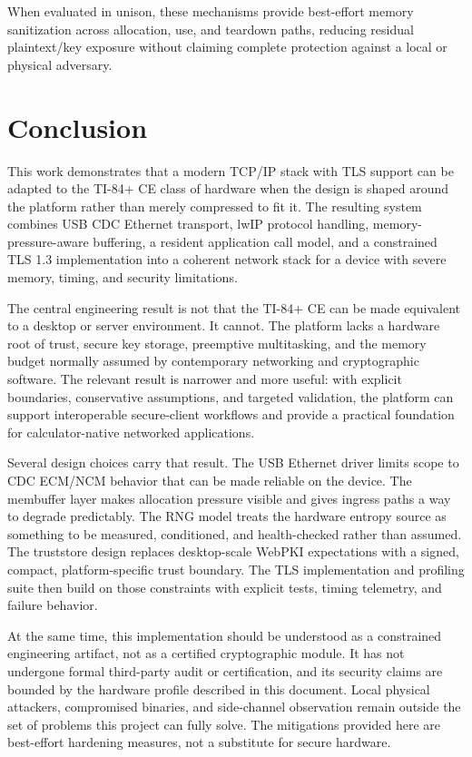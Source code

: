\documentclass[titlepage]{report}
\begin{document}
When evaluated in unison, these mechanisms provide best-effort memory sanitization across allocation, use, and teardown paths, reducing residual plaintext/key exposure without claiming complete protection against a local or physical adversary.

	
		\newpage
		
		\section{Conclusion}
		This work demonstrates that a modern TCP/IP stack with TLS support can be adapted to the TI-84+ CE class of hardware when the design is shaped around the platform rather than merely compressed to fit it. The resulting system combines USB CDC Ethernet transport, lwIP protocol handling, memory-pressure-aware buffering, a resident application call model, and a constrained TLS 1.3 implementation into a coherent network stack for a device with severe memory, timing, and security limitations.
		
		The central engineering result is not that the TI-84+ CE can be made equivalent to a desktop or server environment. It cannot. The platform lacks a hardware root of trust, secure key storage, preemptive multitasking, and the memory budget normally assumed by contemporary networking and cryptographic software. The relevant result is narrower and more useful: with explicit boundaries, conservative assumptions, and targeted validation, the platform can support interoperable secure-client workflows and provide a practical foundation for calculator-native networked applications.
		
		Several design choices carry that result. The USB Ethernet driver limits scope to CDC ECM/NCM behavior that can be made reliable on the device. The membuffer layer makes allocation pressure visible and gives ingress paths a way to degrade predictably. The RNG model treats the hardware entropy source as something to be measured, conditioned, and health-checked rather than assumed. The truststore design replaces desktop-scale WebPKI expectations with a signed, compact, platform-specific trust boundary. The TLS implementation and profiling suite then build on those constraints with explicit tests, timing telemetry, and failure behavior.
		
		At the same time, this implementation should be understood as a constrained engineering artifact, not as a certified cryptographic module. It has not undergone formal third-party audit or certification, and its security claims are bounded by the hardware profile described in this document. Local physical attackers, compromised binaries, and side-channel observation remain outside the set of problems this project can fully solve. The mitigations provided here are best-effort hardening measures, not a substitute for secure hardware.
		
\end{document}
